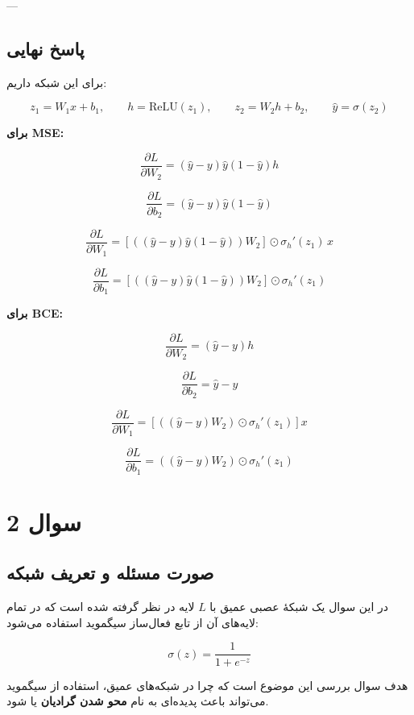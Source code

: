 \documentclass[12pt,a4paper]{article}
\begin{document}
---

\subsection{پاسخ نهایی}

\begin{tcolorbox}[colback=softgray,colframe=mainblue,title=پاسخ نهایی فشرده]
	برای این شبکه داریم:
	
	\[
	z_1=W_1x+b_1,\qquad h=\mathrm{ReLU}(z_1),\qquad z_2=W_2h+b_2,\qquad \hat{y}=\sigma(z_2)
	\]
	
	\textbf{برای MSE:}
	
	\[
	\frac{\partial L}{\partial W_2}=(\hat{y}-y)\hat{y}(1-\hat{y})h
	\]
	
	\[
	\frac{\partial L}{\partial b_2}=(\hat{y}-y)\hat{y}(1-\hat{y})
	\]
	
	\[
	\frac{\partial L}{\partial W_1}=
	\left[\left((\hat{y}-y)\hat{y}(1-\hat{y})\right)W_2\right]\odot \sigma_h'(z_1)\,x
	\]
	
	\[
	\frac{\partial L}{\partial b_1}=
	\left[\left((\hat{y}-y)\hat{y}(1-\hat{y})\right)W_2\right]\odot \sigma_h'(z_1)
	\]
	
	\vspace{0.2cm}
	
	\textbf{برای BCE:}
	
	\[
	\frac{\partial L}{\partial W_2}=(\hat{y}-y)h
	\]
	
	\[
	\frac{\partial L}{\partial b_2}=\hat{y}-y
	\]
	
	\[
	\frac{\partial L}{\partial W_1}=
	\left[\left((\hat{y}-y)W_2\right)\odot \sigma_h'(z_1)\right]x
	\]
	
	\[
	\frac{\partial L}{\partial b_1}=
	\left((\hat{y}-y)W_2\right)\odot \sigma_h'(z_1)
	\]
\end{tcolorbox}
\section{سوال 2}

\subsection{صورت مسئله و تعریف شبکه}

در این سوال یک شبکهٔ عصبی عمیق با \(L\) لایه در نظر گرفته شده است که در تمام لایه‌های آن از تابع فعال‌ساز سیگموید استفاده می‌شود:

\[
\sigma(z)=\frac{1}{1+e^{-z}}
\]

هدف سوال بررسی این موضوع است که چرا در شبکه‌های عمیق، استفاده از سیگموید می‌تواند باعث پدیده‌ای به نام \textbf{محو شدن گرادیان} یا  شود.
\end{document}
